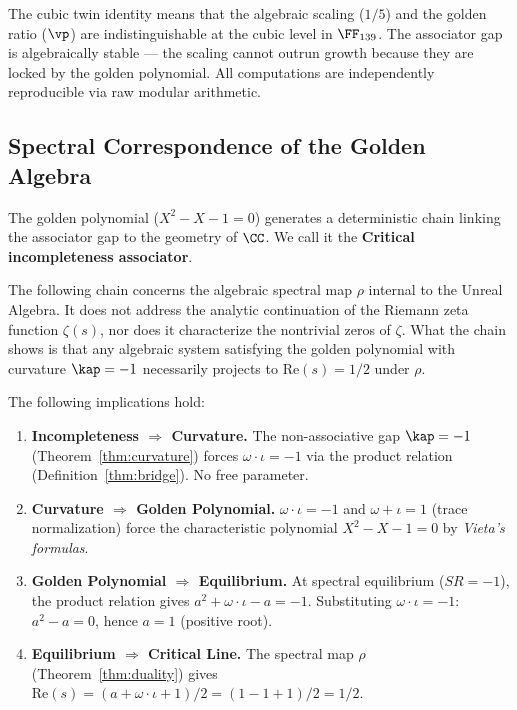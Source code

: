 \begin{remark}
The cubic twin identity means that the algebraic scaling ($1/5$) and the golden ratio ($\vp$) are indistinguishable at the cubic level in $\FF_{139}$. The associator gap is algebraically stable --- the scaling cannot outrun growth because they are locked by the golden polynomial. All computations are independently reproducible via raw modular arithmetic.
\end{remark}


\subsection{Spectral Correspondence of the Golden Algebra}

The golden polynomial ($X^2 - X - 1 = 0$) generates a deterministic chain linking the associator gap to the geometry of $\CC$. We call it the \textbf{Critical incompleteness associator}.

\begin{remark}
The following chain concerns the algebraic spectral map $\rho$ internal to the Unreal Algebra. It does not address the analytic continuation of the Riemann zeta function $\zeta(s)$, nor does it characterize the nontrivial zeros of $\zeta$. What the chain shows is that any algebraic system satisfying the golden polynomial with curvature $\kap = -1$ necessarily projects to $\mathrm{Re}(s) = 1/2$ under $\rho$.
\end{remark}

\begin{theorem}\label{thm:spectral-chain}
The following implications hold:
\begin{enumerate}
\item \textbf{Incompleteness $\Rightarrow$ Curvature.} The non-associative gap $\kap = -1$ (Theorem~\ref{thm:curvature}) forces $\omega \cdot \iota = -1$ via the product relation (Definition~\ref{thm:bridge}). No free parameter.
\item \textbf{Curvature $\Rightarrow$ Golden Polynomial.} $\omega \cdot \iota = -1$ and $\omega + \iota = 1$ (trace normalization) force the characteristic polynomial $X^2 - X - 1 = 0$ by \emph{Vieta's formulas}.
\item \textbf{Golden Polynomial $\Rightarrow$ Equilibrium.} At spectral equilibrium ($SR = -1$), the product relation gives $a^2 + \omega \cdot \iota - a = -1$. Substituting $\omega \cdot \iota = -1$: $a^2 - a = 0$, hence $a = 1$ (positive root).
\item \textbf{Equilibrium $\Rightarrow$ Critical Line.} The spectral map $\rho$ (Theorem~\ref{thm:duality}) gives $\mathrm{Re}(s) = (a + \omega \cdot \iota + 1)/2 = (1 - 1 + 1)/2 = 1/2$.
\end{enumerate}
\end{theorem}

